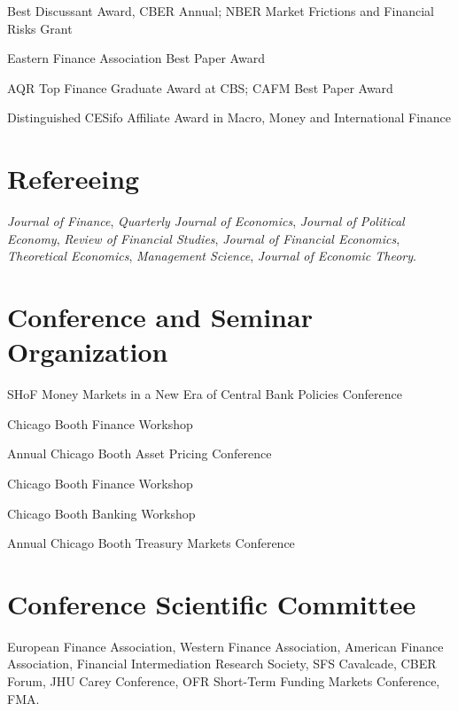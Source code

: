 \documentclass[11pt]{res} %
\begin{document}
\begin{resume}
 Best Discussant Award, CBER Annual; NBER Market Frictions and Financial Risks Grant

 Eastern Finance Association Best Paper Award

 AQR Top Finance Graduate Award at CBS; CAFM Best Paper Award

 Distinguished CESifo Affiliate Award in Macro, Money and International Finance

\section{Refereeing} 
\vspace{8pt}

\textit{Journal of Finance}, \textit{Quarterly Journal of Economics}, \textit{Journal of Political Economy}, \textit{Review of Financial Studies}, \textit{Journal of Financial Economics}, \textit{Theoretical Economics}, \textit{Management Science}, \textit{Journal of Economic Theory}.

\section{Conference and Seminar Organization} 
\vspace{8pt}

 SHoF Money Markets in a New Era of Central Bank Policies Conference

 Chicago Booth Finance Workshop

 Annual Chicago Booth Asset Pricing Conference

 Chicago Booth Finance Workshop

 Chicago Booth Banking Workshop

 Annual Chicago Booth Treasury Markets Conference

\section{Conference Scientific Committee} 
\vspace{8pt}

European Finance Association, Western Finance Association, American Finance Association, Financial Intermediation Research Society, SFS Cavalcade, CBER Forum, JHU Carey Conference, OFR Short-Term Funding Markets Conference, FMA.

\end{resume} 
\end{document}
